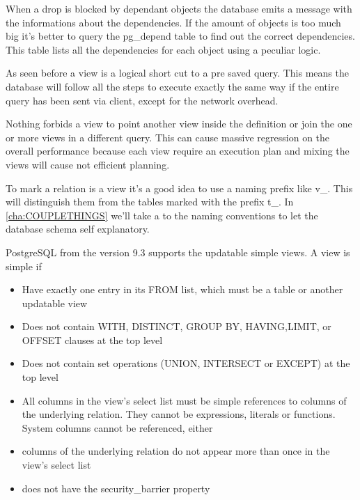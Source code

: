 When a drop is blocked by dependant objects the database emits a message with 
the informations about the dependencies. If the amount of objects is too much 
big it's better to query the pg\_depend table to find out the correct 
dependencies. This table lists all the dependencies for each object using a 
peculiar logic.


As seen before a view is a logical short cut to a pre saved query. This means 
the database will follow all the steps to execute exactly the same way if the 
entire query has been sent via client, except for the network overhead.

Nothing forbids a view to point another view inside the definition or join 
the one or more views in a different query. This can cause massive 
regression on the overall performance because each view require an execution 
plan and mixing the views will cause not efficient planning. 

To mark a relation is a view it's a good idea to use a naming prefix like v\_. 
This will distinguish them from the tables marked with the prefix t\_.
In \ref{cha:COUPLETHINGS} we'll take a to the naming conventions to let the 
database schema self explanatory.

PostgreSQL from the version 9.3 supports the updatable simple views. 
A view is simple if

\begin{itemize}


 \item   Have exactly one entry in its FROM list, which must be a table or 
another updatable view

 \item Does not contain WITH, DISTINCT, GROUP BY, HAVING,LIMIT, or OFFSET 
clauses at the top level

 \item  Does not contain set operations (UNION, INTERSECT or EXCEPT) at the 
top level

 \item   All columns in the view's select list must be simple references to 
columns of the underlying relation. They cannot be expressions, literals or 
functions. System columns cannot be referenced, either

 \item   columns of the underlying relation do not appear more than once in 
the view's select list

 \item   does not have the security\_barrier property

\end{itemize}

